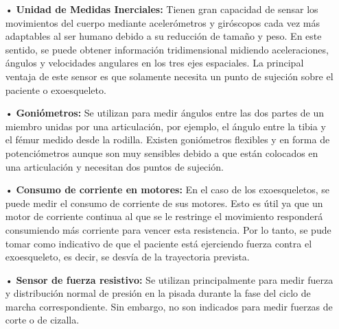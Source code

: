 \begin{itemize}
\item[•] \textbf{Unidad de Medidas Inerciales:} Tienen gran capacidad de sensar los movimientos del cuerpo mediante acelerómetros y giróscopos cada vez más adaptables al ser humano debido a su reducción de tamaño y peso. En este sentido, se puede obtener información tridimensional midiendo aceleraciones, ángulos y velocidades angulares en los tres ejes espaciales. La principal ventaja de este sensor es que solamente necesita un punto de sujeción sobre el paciente o exoesqueleto.

\item[•] \textbf{Goniómetros:} Se utilizan para medir ángulos entre las dos partes de un miembro unidas por una articulación, por ejemplo, el ángulo entre la tibia y el fémur medido desde la rodilla. Existen goniómetros flexibles y en forma de potenciómetros aunque son muy sensibles debido a que están colocados en una articulación y necesitan dos puntos de sujeción.

\item[•] \textbf{Consumo de corriente en motores:} En el caso de los exoesqueletos, se puede medir el consumo de corriente de sus motores. Esto es útil ya que un motor de corriente continua al que se le restringe el movimiento responderá consumiendo más corriente para vencer esta resistencia. Por lo tanto, se pude tomar como indicativo de que el paciente está ejerciendo fuerza contra el exoesqueleto, es decir, se desvía de la trayectoria prevista. 

\item[•] \textbf{Sensor de fuerza resistivo:} Se utilizan principalmente para medir fuerza y distribución normal de presión en la pisada durante la fase del ciclo de marcha correspondiente. Sin embargo, no son indicados para medir fuerzas de corte o de cizalla. 


\end{itemize}
